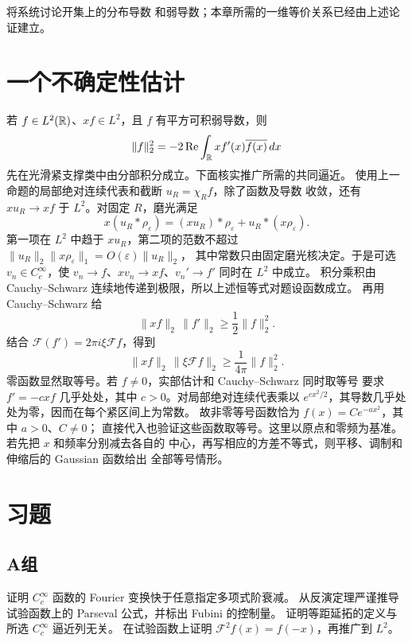 将系统讨论开集上的分布导数
和弱导数；本章所需的一维等价关系已经由上述论证建立。

\section{一个不确定性估计}

若 \(f\in L^2(\mathbb{R})\)、\(xf\in L^2\)，且 \(f\) 有平方可积弱导数，则
\[
 \|f\|_2^2=-2\operatorname{Re}\int_{\mathbb{R}} x f'(x)\overline{f(x)}\,dx
\]
先在光滑紧支撑类中由分部积分成立。下面核实推广所需的共同逼近。
使用上一命题的局部绝对连续代表和截断 \(u_R=\chi_Rf\)，除了函数及导数
收敛，还有 \(xu_R\to xf\) 于 \(L^2\)。对固定 \(R\)，磨光满足
\[
 x(u_R*\rho_\varepsilon)
 =(xu_R)*\rho_\varepsilon+u_R*(x\rho_\varepsilon).
\]
第一项在 \(L^2\) 中趋于 \(xu_R\)，第二项的范数不超过
\(\|u_R\|_2\|x\rho_\varepsilon\|_1=O(\varepsilon)\|u_R\|_2\)，
其中常数只由固定磨光核决定。于是可选 \(v_n\in C_c^\infty\)，使
\(v_n\to f\)、\(xv_n\to xf\)、\(v_n'\to f'\) 同时在 \(L^2\) 中成立。
积分乘积由 Cauchy--Schwarz 连续地传递到极限，所以上述恒等式对题设函数成立。
再用 Cauchy--Schwarz 给
\[
 \|xf\|_2\,\|f'\|_2\ge\frac12\|f\|_2^2.
\]
结合 \(\mathcal F(f')=2\pi i\xi\mathcal Ff\)，得到
\begin{equation}\label{eq:heisenberg-simple}
 \|xf\|_2\,\|\xi\mathcal Ff\|_2
 \ge\frac1{4\pi}\|f\|_2^2.
\end{equation}
零函数显然取等号。若 \(f\ne0\)，实部估计和 Cauchy--Schwarz 同时取等号
要求 \(f'=-cxf\) 几乎处处，其中 \(c>0\)。对局部绝对连续代表乘以
\(e^{cx^2/2}\)，其导数几乎处处为零，因而在每个紧区间上为常数。
故非零等号函数恰为 \(f(x)=Ce^{-a x^2}\)，其中 \(a>0\)、\(C\ne0\)；
直接代入也验证这些函数取等号。这里以原点和零频为基准。
若先把 \(x\) 和频率分别减去各自的
中心，再写相应的方差不等式，则平移、调制和伸缩后的 Gaussian 函数给出
全部等号情形。

\section*{习题}
\subsection*{A组}
\begin{enumerate}[label=\textbf{\thechapter.\arabic*.}]
证明 \(C_c^\infty\) 函数的 Fourier 变换快于任意指定多项式阶衰减。
从反演定理严谨推导试验函数上的 Parseval 公式，并标出 Fubini 的控制量。
证明等距延拓的定义与所选 \(C_c^\infty\) 逼近列无关。
在试验函数上证明 \(\mathcal F^2f(x)=f(-x)\)，再推广到 \(L^2\)。
\end{enumerate}
